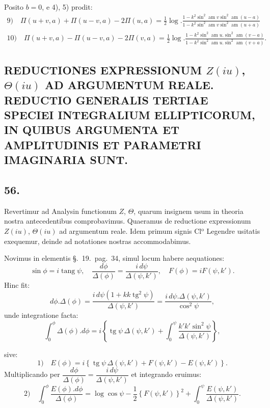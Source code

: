 \documentclass{article}
\begin{document}
Posito $b=0$, e 4), 5) prodit:
\[
\begin{gathered}
\text{9)}\quad \Pi(u+v,a)+\Pi(u-v,a)-2\Pi(u,a)=\frac{1}{2}\log.\frac{1-k^{2}\sin^{2}\operatorname{am}v\sin^{2}\operatorname{am}(u-a)}{1-k^{2}\sin^{2}\operatorname{am}v\sin^{2}\operatorname{am}(u+a)}\\[1.5ex]
\text{10)}\quad \Pi(u+v,a)-\Pi(u-v,a)-2\Pi(v,a)=\frac{1}{2}\log.\frac{1-k^{2}\sin^{2}\operatorname{am}u.\sin^{2}\operatorname{am}(v-a)}{1-k^{2}\sin^{2}\operatorname{am}u.\sin^{2}\operatorname{am}(v+a)}.
\end{gathered}
\]

\subsection*{REDUCTIONES EXPRESSIONUM $Z(iu)$, $\Theta(iu)$ AD ARGUMENTUM REALE. REDUCTIO GENERALIS TERTIAE SPECIEI INTEGRALIUM ELLIPTICORUM, IN QUIBUS ARGUMENTA ET AMPLITUDINIS ET PARAMETRI IMAGINARIA SUNT.}

\subsection*{56.}

Revertimur ad Analysin functionum $Z$, $\Theta$, quarum insignem usum in theoria nostra antecedentibus comprobavimus. Quaeramus de reductione expressionum $Z(iu)$, $\Theta(iu)$ ad argumentum reale. Idem primum signis Cl$^{\mathrm{o}}$ Legendre usitatis exequemur, deinde ad notationes nostras accommodabimus.

Novimus in elementis §.\ 19.\ pag.\ 34, simul locum habere aequationes:
\[
\sin\phi=i\operatorname{tang}\psi,\quad \frac{d\phi}{\Delta(\phi)}=\frac{i\,d\psi}{\Delta(\psi,k')},\quad F(\phi)=iF(\psi,k').
\]
Hinc fit:
\[
d\phi.\Delta(\phi)=\frac{i\,d\psi(1+kk\operatorname{tg}^{2}\psi)}{\Delta(\psi,k')}=\frac{i\,d\psi.\Delta(\psi,k')}{\cos^{2}\psi},
\]
unde integratione facta:
\[
\int_{0}^{\phi}\Delta(\phi).d\phi=i\left\{\operatorname{tg}\psi\,\Delta(\psi,k')+\int_{0}^{\psi}\frac{k'k'\sin^{2}\psi}{\Delta(\psi,k')}\right\},
\]

sive:
\[
\text{1)}\quad E(\phi)=i\left\{\operatorname{tg}\psi\,\Delta(\psi,k')+F(\psi,k')-E(\psi,k')\right\}.
\]
Multiplicando per $\dfrac{d\phi}{\Delta(\phi)}=\dfrac{i\,d\psi}{\Delta(\psi,k')}$ et integrando eruimus:
\[
\text{2)}\quad \int_{0}^{\phi}\frac{E(\phi).d\phi}{\Delta(\phi)}=\log\cos\psi-\frac{1}{2}\left\{F(\psi,k')\right\}^{2}+\int_{0}^{\psi}\frac{E(\psi,k')}{\Delta(\psi,k')}.
\]
\end{document}
